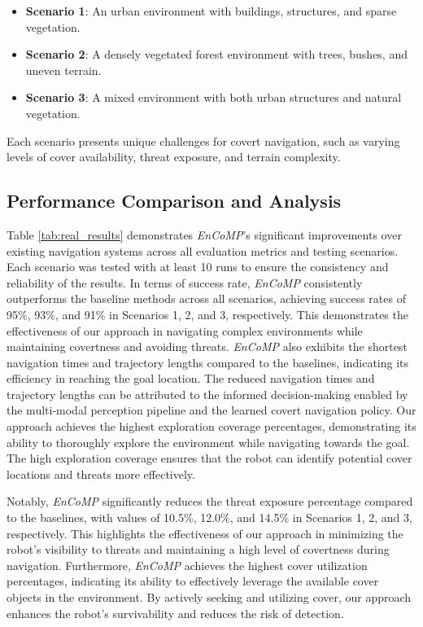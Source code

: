\begin{itemize}
\item \textbf{Scenario 1}: An urban environment with buildings, structures, and sparse vegetation.
\item \textbf{Scenario 2}: A densely vegetated forest environment with trees, bushes, and uneven terrain.
\item \textbf{Scenario 3}: A mixed environment with both urban structures and natural vegetation.
\end{itemize}

Each scenario presents unique challenges for covert navigation, such as varying levels of cover availability, threat exposure, and terrain complexity.
\subsection{Performance Comparison and Analysis}
Table \ref{tab:real_results} demonstrates \textit{EnCoMP}'s significant improvements over existing navigation systems across all evaluation metrics and testing scenarios. Each scenario was tested with at least 10 runs to ensure the consistency and reliability of the results. In terms of success rate, \textit{EnCoMP} consistently outperforms the baseline methods across all scenarios, achieving success rates of 95\%, 93\%, and 91\% in Scenarios 1, 2, and 3, respectively. This demonstrates the effectiveness of our approach in navigating complex environments while maintaining covertness and avoiding threats. \textit{EnCoMP} also exhibits the shortest navigation times and trajectory lengths compared to the baselines, indicating its efficiency in reaching the goal location. The reduced navigation times and trajectory lengths can be attributed to the informed decision-making enabled by the multi-modal perception pipeline and the learned covert navigation policy. Our approach achieves the highest exploration coverage percentages, demonstrating its ability to thoroughly explore the environment while navigating towards the goal. The high exploration coverage ensures that the robot can identify potential cover locations and threats more effectively.

Notably, \textit{EnCoMP} significantly reduces the threat exposure percentage compared to the baselines, with values of 10.5\%, 12.0\%, and 14.5\% in Scenarios 1, 2, and 3, respectively. This highlights the effectiveness of our approach in minimizing the robot's visibility to threats and maintaining a high level of covertness during navigation. Furthermore, \textit{EnCoMP} achieves the highest cover utilization percentages, indicating its ability to effectively leverage the available cover objects in the environment. By actively seeking and utilizing cover, our approach enhances the robot's survivability and reduces the risk of detection. 


